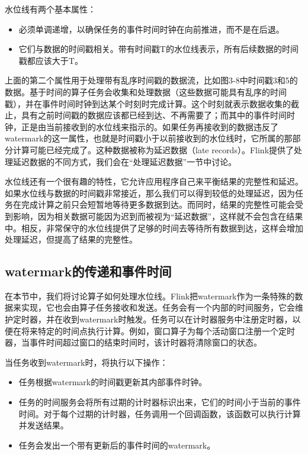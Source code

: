 \documentclass[cn,11pt,chinese]{elegantbook}
\begin{document}
水位线有两个基本属性：

\begin{itemize}
    \item 必须单调递增，以确保任务的事件时间时钟在向前推进，而不是在后退。
    \item 它们与数据的时间戳相关。带有时间戳T的水位线表示，所有后续数据的时间戳都应该大于T。
\end{itemize}

上面的第二个属性用于处理带有乱序时间戳的数据流，比如图3-8中时间戳3和5的数据。基于时间的算子任务会收集和处理数据（这些数据可能具有乱序的时间戳），并在事件时间时钟到达某个时刻时完成计算。这个时刻就表示数据收集的截止，具有之前时间戳的数据应该都已经到达、不再需要了；而其中的事件时间时钟，正是由当前接收到的水位线来指示的。如果任务再接收到的数据违反了watermark的这一属性，也就是时间戳小于以前接收到的水位线时，它所属的那部分计算可能已经完成了。这种数据被称为延迟数据（late records）。Flink提供了处理延迟数据的不同方式，我们会在“处理延迟数据”一节中讨论。

水位线还有一个很有趣的特性，它允许应用程序自己来平衡结果的完整性和延迟。如果水位线与数据的时间戳非常接近，那么我们可以得到较低的处理延迟，因为任务在完成计算之前只会短暂地等待更多数据到达。而同时，结果的完整性可能会受到影响，因为相关数据可能因为迟到而被视为“延迟数据”，这样就不会包含在结果中。相反，非常保守的水位线提供了足够的时间去等待所有数据到达，这样会增加处理延迟，但提高了结果的完整性。

\subsection{watermark的传递和事件时间}

在本节中，我们将讨论算子如何处理水位线。Flink把watermark作为一条特殊的数据来实现，它也会由算子任务接收和发送。任务会有一个内部的时间服务，它会维护定时器，并在收到watermark时触发。任务可以在计时器服务中注册定时器，以便在将来特定的时间点执行计算。例如，窗口算子为每个活动窗口注册一个定时器，当事件时间超过窗口的结束时间时，该计时器将清除窗口的状态。

当任务收到watermark时，将执行以下操作：

\begin{itemize}
    \item 任务根据watermark的时间戳更新其内部事件时钟。
    \item 任务的时间服务会将所有过期的计时器标识出来，它们的时间小于当前的事件时间。对于每个过期的计时器，任务调用一个回调函数，该函数可以执行计算并发送结果。
    \item 任务会发出一个带有更新后的事件时间的watermark。
\end{itemize}
\end{document}
